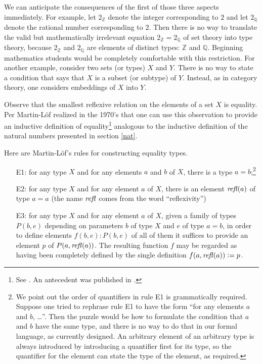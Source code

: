 \documentclass[letter,12pt]{amsart}
\theoremstyle{definition}
\theoremstyle{remark}
\numberwithin{equation}{section}
\newcommand{\refl}{\mathop{{\it refl}}}
\newcommand{\QQ}{\mathbb{Q}}
\newcommand{\ZZ}{\mathbb{Z}}
\newcommand{\defeq}{\vcentcolon=}
\begin{document}
We can anticipate the consequences of the first of those three aspects immediately.  For example, let $2_\ZZ$ denote the integer corresponding
to $2$ and let $2_\QQ$ denote the rational number corresponding to $2$.  Then there is no way to translate the valid but mathematically
irrelevant equation $2_\ZZ = 2_\QQ$ of set theory into type theory, because $2_\ZZ$ and $2_\QQ$ are elements of distinct types: $\ZZ$ and $\QQ$.
Beginning mathematics students would be completely comfortable with this restriction.  For another example, consider two sets (or types) $X$ and
$Y$.  There is no way to state a condition that says that $X$ is a subset (or subtype) of $Y$.  Instead, as in category theory, one considers
embeddings of $X$ into $Y$.

Observe that the smallest reflexive relation on the elements of a set $X$ is equality.  Per Martin-L\"of realized in the 1970's that one can use
this observation to provide an inductive definition of equality\footnote{See \citep[section 1.7]{MR0387009}.  An antecedent was published in
  \citep[section 3.8.2, p.{} 190]{MR0387023}.} analogous to the inductive definition of the natural numbers presented in section \ref{nat}.

Here are Martin-L\"of's rules for constructing equality types.
\begin{enumerate}
\item[E1:]
  for any type $X$ and for any elements $a$ and $b$ of $X$, there is a type $a=b$;\footnote{
    We point out the order of quantifiers in rule E1 is grammatically required.  Suppose one tried to rephrase rule E1 to have the form
    ``for any elements $a$ and $b$, \dots''.  Then the puzzle would be how to formulate the condition that $a$ and $b$ have the same type, and there
    is no way to do that in our formal language, as currently designed.  An arbitrary element of an arbitrary type is always introduced by %
    introducing a quantifier first for its type, so the quantifier for the element can state the type of the element, as required.
  }
\item[E2:] for any type $X$ and for any element $a$ of $X$, there is an element $\refl(a)$ of type $a=a$ (the name $\refl$ comes from the word
  ``reflexivity'')
\item[E3:] for any type $X$ and for any element $a$ of $X$, given a family of types $P(b,e)$ depending on parameters $b$ of type $X$ and $e$ of type
  $a=b$, in order to define elements $f(b,e) : P(b,e)$ of all of them it suffices to provide an element $p$ of $P(a,\refl(a))$.  The resulting
  function $f$ may be regarded as having been completely defined by the single definition $f(a,\refl(a)) \defeq p$.
\end{enumerate}
\end{document}
